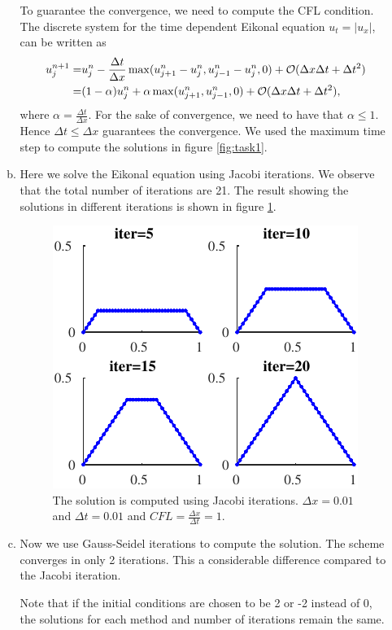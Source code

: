 \documentclass[10pt,a4paper,twoside, french]{article}
\numberwithin{equation}{section}
\numberwithin{figure}{section}
\numberwithin{table}{section}
\begin{document}
\begin{enumerate}
\begin{enumerate}[a.]
To guarantee the convergence, we need to compute the CFL condition. The discrete system for the time dependent Eikonal equation $u_t=|u_x|$, can be written as
\begin{align*}
u_j^{n+1}=&u_j^n-\frac{\Delta t}{\Delta x} \max(u_{j+1}^n-u_j^n,u_{j-1}^n-u_j^n,0)+{\cal O}(\Delta x\Delta t+\Delta t^2) \\
=&(1-\alpha)u_j^n+\alpha\max(u_{j+1}^n,u_{j-1}^n,0)+{\cal O}(\Delta x\Delta t+\Delta t^2),
\end{align*}
where $\alpha=\frac{\Delta t}{\Delta x}$. For the sake of convergence, we need to have that $\alpha\leq 1$. Hence $\Delta t\leq  \Delta x$ guarantees the convergence. We used the maximum time step to compute the solutions in figure \ref{fig:task1}.

\item Here we solve the Eikonal equation using Jacobi iterations. We observe that the total number of iterations are 21. The result showing the solutions in different iterations is shown in figure \ref{fig:task2}.
\begin{figure}[h]
\centering
\includegraphics[scale=1.5]{fig/Task2}
\caption{The solution is computed using Jacobi iterations. $\Delta x=0.01$ and $\Delta t=0.01$ and $CFL=\frac{\Delta x}{\Delta t}=1$.}
\label{fig:task2}
\end{figure}

\item Now we use Gauss-Seidel iterations to compute the solution. The scheme converges in only 2 iterations. This a considerable difference compared to the Jacobi iteration.

Note that if the initial conditions are chosen to be 2 or -2 instead of 0, the solutions for each method and number of iterations remain the same. 


\end{enumerate}
\end{enumerate}
\end{document}

